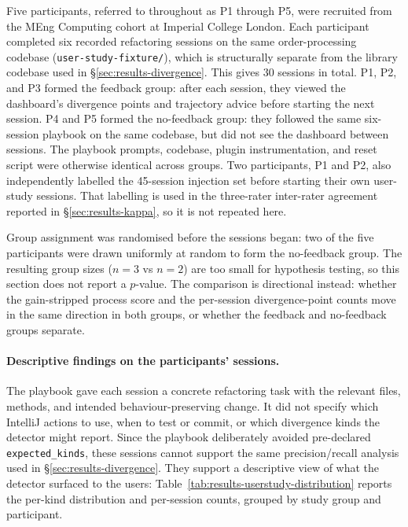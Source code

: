 Five participants, referred to throughout as P1 through P5, were recruited from the MEng Computing cohort at Imperial College London. Each participant completed six recorded refactoring sessions on the same order-processing codebase (\texttt{user-study-fixture/}), which is structurally separate from the library codebase used in \S\ref{sec:results-divergence}. This gives $30$ sessions in total. P1, P2, and P3 formed the feedback group: after each session, they viewed the dashboard's divergence points and trajectory advice before starting the next session. P4 and P5 formed the no-feedback group: they followed the same six-session playbook on the same codebase, but did not see the dashboard between sessions. The playbook prompts, codebase, plugin instrumentation, and reset script were otherwise identical across groups. Two participants, P1 and P2, also independently labelled the 45-session injection set before starting their own user-study sessions. That labelling is used in the three-rater inter-rater agreement reported in \S\ref{sec:results-kappa}, so it is not repeated here.

Group assignment was randomised before the sessions began: two of the five participants were drawn uniformly at random to form the no-feedback group. The resulting group sizes ($n = 3$ vs $n = 2$) are too small for hypothesis testing, so this section does not report a $p$-value. The comparison is directional instead: whether the gain-stripped process score and the per-session divergence-point counts move in the same direction in both groups, or whether the feedback and no-feedback groups separate.

\paragraph{Descriptive findings on the participants' sessions.}
The playbook gave each session a concrete refactoring task with the relevant files, methods, and intended behaviour-preserving change. It did not specify which IntelliJ actions to use, when to test or commit, or which divergence kinds the detector might report. Since the playbook deliberately avoided pre-declared \texttt{expected\_kinds}, these sessions cannot support the same precision/recall analysis used in \S\ref{sec:results-divergence}. They support a descriptive view of what the detector surfaced to the users: Table~\ref{tab:results-userstudy-distribution} reports the per-kind distribution and per-session counts, grouped by study group and participant.

